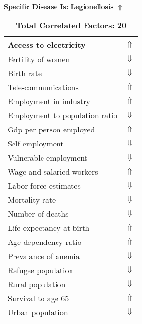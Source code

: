 \documentclass[12pt,notitlepage,oneside]{report}
\begin{document}
\begin{table}[!htb]
\caption{\textbf{Specific Disease Is: Legionellosis $\Uparrow$}}
\centering
\label{Correlated Socio-economic Factors0}
\begin{tabular}{|l|l|}
\hline
Access to electricity & $\Uparrow$\\ \hline
Fertility of women & $\Downarrow$\\ \hline
Birth rate & $\Downarrow$\\ \hline
Tele-communications & $\Uparrow$\\ \hline
Employment in industry & $\Uparrow$\\ \hline
Employment to population ratio & $\Downarrow$\\ \hline
Gdp per person employed & $\Uparrow$\\ \hline
Self employment & $\Downarrow$\\ \hline
Vulnerable employment & $\Downarrow$\\ \hline
Wage and salaried workers & $\Uparrow$\\ \hline
Labor force estimates & $\Downarrow$\\ \hline
Mortality rate & $\Downarrow$\\ \hline
Number of deaths & $\Downarrow$\\ \hline
Life expectancy at birth & $\Uparrow$\\ \hline
Age dependency ratio & $\Uparrow$\\ \hline
Prevalance of anemia & $\Downarrow$\\ \hline
Refugee population & $\Downarrow$\\ \hline
Rural population & $\Downarrow$\\ \hline
Survival to age 65 & $\Uparrow$\\ \hline
Urban population & $\Downarrow$\\ \hline
\end{tabular}
\caption*{\textbf{Total Correlated Factors: 20}}
\end{table}
\end{document}
